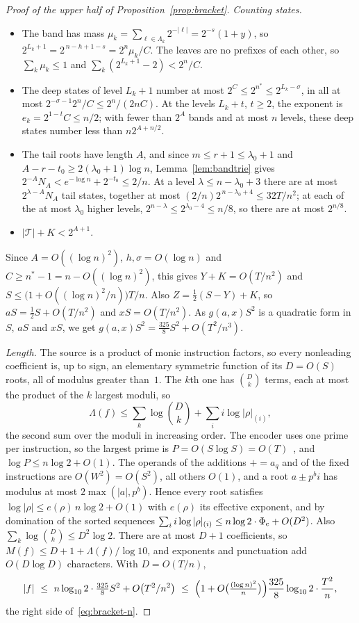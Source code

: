\documentclass[11pt]{article}
\theoremstyle{remark}
\begin{document}
\begin{proof}[Proof of the upper half of Proposition~\ref{prop:bracket}]
\emph{Counting states.}
\begin{itemize}
\item The band has mass $\mu_k=\sum_{\ell\in\Lambda_k}2^{-|\ell|}=2^{-s}(1+y)$, so
$2^{L_k+1}=2^{\,n-h+1-s}=2^n\mu_k/C$.  The leaves are no prefixes of each other, so
$\sum_k\mu_k\le1$ and $\sum_k(2^{L_k+1}-2)<2^n/C$.
\item The deep states of level $L_k+1$ number at most $2^C\le2^{n^*}\le2^{L_k-\sigma}$,
in all at most $2^{-\sigma-1}2^n/C\le2^n/(2nC)$.  At the levels $L_k+t$, $t\ge2$, the
exponent is $e_k=2^{1-t}C\le n/2$; with fewer than $2^A$ bands and at most $n$ levels,
these deep states number less than $n2^{A+n/2}$.
\item The tail roots have length $A$, and since $m\le r+1\le\lambda_0+1$ and
$A-r-t_0\ge2(\lambda_0+1)\log n$, Lemma~\ref{lem:bandtrie} gives
$2^{-A}N_A<e^{-\log n}+2^{-t_0}\le2/n$.  At a level $\lambda\le n-\lambda_0+3$ there are
at most $2^{\lambda-A}N_A$ tail states, together at most $(2/n)2^{\,n-\lambda_0+4}\le32T/n^2$;
at each of the at most $\lambda_0$ higher levels, $2^{n-\lambda}\le2^{\lambda_0-4}\le n/8$,
so there are at most $2^{n/8}$.
\item $|\mathcal T|+K<2^{A+1}$.
\end{itemize}
Since $A=O((\log n)^2)$, $h,\sigma=O(\log n)$ and $C\ge n^*-1=n-O((\log n)^2)$, this gives
$Y+K=O(T/n^2)$ and $S\le\bigl(1+O((\log n)^2/n)\bigr)T/n$.  Also $Z=\frac12(S-Y)+K$, so
$aS=\frac12S+O(T/n^2)$ and $xS=O(T/n^2)$.  As $g(a,x)S^2$ is a quadratic form in $S$,
$aS$ and $xS$, we get $g(a,x)S^2=\frac{325}8S^2+O(T^2/n^3)$.

\emph{Length.}  The source is a product of monic instruction factors, so every
nonleading coefficient is, up to sign, an elementary symmetric function of its $D=O(S)$
roots, all of modulus greater than~$1$.  The $k$th one has $\binom Dk$ terms, each at most
the product of the $k$ largest moduli, so
\[
  \Lambda(f)\le\sum_{k}\log\binom Dk+\sum_{i}i\log|\rho|_{(i)} ,
\]
the second sum over the moduli in increasing order.  The encoder uses one prime per
instruction, so the largest prime is $P=O(S\log S)=O(T)$~\cite{rs}, and
$\log P\le n\log2+O(1)$.  The operands of the additions $\mathord{+}\!=a_q$ and of the
fixed instructions are $O(W^2)=O(S^2)$, all others $O(1)$, and a root $a\pm p^bi$ has
modulus at most $2\max(|a|,p^b)$.  Hence every root satisfies
$\log|\rho|\le e(\rho)\,n\log2+O(1)$ with $e(\rho)$ its effective exponent, and by
domination of the sorted sequences
$\sum_ii\log|\rho|_{(i)}\le n\log2\cdot\Phi_{\rm e}+O(D^2)$.  Also
$\sum_k\log\binom Dk\le D^2\log2$.  There are at most $D+1$ coefficients, so
$M(f)\le D+1+\Lambda(f)/\log10$, and exponents and punctuation add $O(D\log D)$
characters.  With $D=O(T/n)$,
\[
  |f|\ \le\ n\log_{10}2\cdot\tfrac{325}8S^2+O\bigl(T^2/n^2\bigr)
  \ \le\ \Bigl(1+O\bigl(\tfrac{(\log n)^2}n\bigr)\Bigr)\frac{325}8\log_{10}2\cdot\frac{T^2}n ,
\]
the right side of~\eqref{eq:bracket-n}.
\end{proof}
\end{document}
